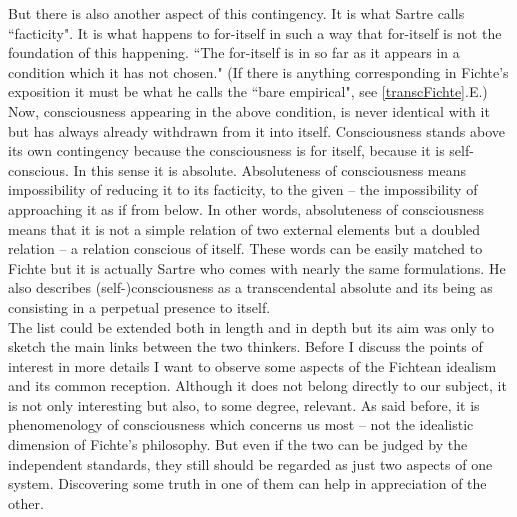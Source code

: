 But there is also another aspect of this contingency. It is what Sartre calls ``facticity".
 It is what happens to for-itself in such a way that for-itself is not the foundation of 
this happening. ``The for-itself is in so far as it appears in 
a condition which it has not chosen." \cite{BN}  
(If there is anything corresponding in Fichte's exposition it must be what 
he calls the ``bare empirical", see \ref{transcFichte}.E.) Now, consciousness appearing in the above condition, is never identical with it but 
has always already withdrawn from it into itself. Consciousness stands above its own contingency because the 
consciousness is for itself, because it is self-conscious. In this sense it is absolute. 
Absoluteness of consciousness 
means impossibility of reducing it to its facticity, to the given -- the impossibility of approaching it as if from below. 
In other words, absoluteness of consciousness means that it is not a simple relation of two external elements but a 
doubled relation -- a relation conscious of itself. These words can be easily matched to Fichte but it is actually 
Sartre who comes with nearly the same formulations. He also describes (self-)consciousness as a transcendental 
absolute and its being as consisting in a perpetual presence to itself. \\[1ex]
 The list could be extended both in length and in depth but its aim was only to sketch the main links between 
the two thinkers. Before I discuss the points of interest in more details I want to observe some aspects of the 
Fichtean idealism and its common reception. Although it does not belong directly to our subject, it is not only 
interesting but also, to some degree, relevant.
As said before, it is phenomenology of consciousness which concerns us most -- not the idealistic dimension of 
Fichte's philosophy. But even if the two can be judged by the independent standards, they still should be regarded 
as just two aspects of one system. Discovering some truth in one of them can help in appreciation of the other. 

